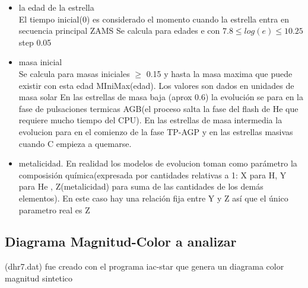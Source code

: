 \documentclass[10pt]{book}
\begin{document}
\begin{itemize}
	\item la edad de la estrella\\
	El tiempo inicial(0) es considerado el momento cuando la estrella entra en secuencia principal ZAMS
	Se calcula para edades e con $7.8 \le log(e) \le 10.25$ step 0.05

	\item masa inicial\\
	Se calcula para masas iniciales $\ge$ 0.15 y hasta la masa maxima que puede existir con esta edad MIniMax(edad). Los valores son dados en unidades de masa solar
	En las estrellas de masa baja (aprox 0.6)  la evolución se para en la fase de pulsaciones termicas AGB(el proceso salta la fase del flash de He que requiere mucho tiempo del CPU). En las estrellas de masa intermedia la evolucion para en el comienzo de  la fase TP-AGP y en las estrellas masivas cuando C empieza a quemarse.

	\item metalicidad. En realidad los modelos de evolucion toman como parámetro la composisión química(expresada por cantidades relativas a 1: X para H, Y para He , Z(metalicidad) para suma de las cantidades de los demás elementos). En este caso hay una relación fija entre Y y Z así que el único parametro real es Z
\end{itemize}



\subsection*{Diagrama Magnitud-Color a analizar}

(dhr7.dat) fue creado con el programa iac-star que genera un diagrama color magnitud sintetico \\
\end{document}
